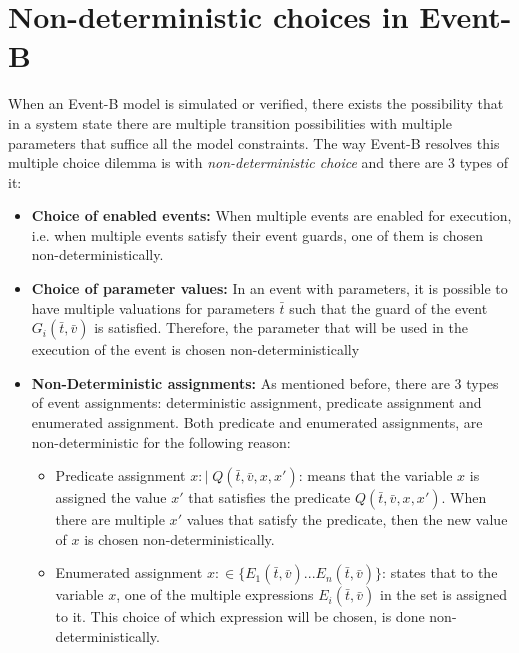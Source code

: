 \section{Non-deterministic choices in Event-B}
When an Event-B model is simulated or verified, there exists the possibility that in a system state there are multiple transition possibilities with multiple parameters that suffice all the model constraints. The way Event-B resolves this multiple choice dilemma is with \textit{non-deterministic choice} and there are 3 types of it:
\begin{itemize}
    \item \textbf{Choice of enabled events:} When multiple events are enabled for execution, i.e. when multiple events satisfy their event guards, one of them is chosen non-deterministically.  
    \item \textbf{Choice of parameter values:} In an event with parameters, it is possible to have multiple valuations for parameters $\bar{t}$ such that the guard of the event $G_i(\bar{t}, \bar{v})$ is satisfied. Therefore, the parameter that will be used in the execution of the event is chosen non-deterministically
    \item \textbf{Non-Deterministic assignments:} As mentioned before, there are 3 types of event assignments: deterministic assignment, predicate assignment and enumerated assignment. Both predicate and enumerated assignments, are non-deterministic for the following reason:
    \begin{itemize}
        \item Predicate assignment $x :\! | \; Q(\bar{t}, \bar{v}, x, x')$: means that the variable $x$ is assigned the value $x'$ that satisfies the predicate $Q(\bar{t}, \bar{v}, x, x')$. When there are multiple $x'$ values that satisfy the predicate, then the new value of $x$ is chosen non-deterministically.
        \item Enumerated assignment $x :\in  \{ E_1(\bar{t},\bar{v})... E_n(\bar{t},\bar{v}) \}$: states that to the variable $x$, one of the multiple expressions $E_i(\bar{t},\bar{v})$ in the set is assigned to it. This choice of which expression will be chosen, is done non-deterministically. 
    \end{itemize}
\end{itemize}
  


